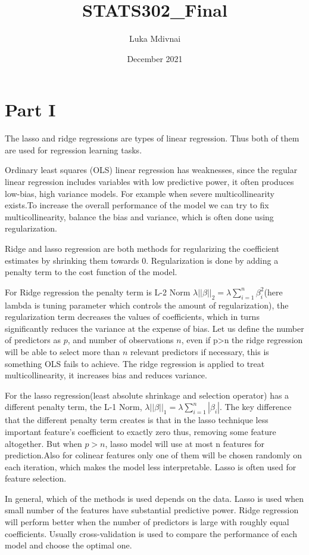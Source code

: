 \documentclass{article}
\title{STATS302\_Final}
\author{Luka Mdivnai}
\date{December 2021}
\begin{document}
\maketitle
\section*{Part I}
The lasso and ridge regressions are types of linear regression. Thus both of them are used for regression learning tasks. 

Ordinary least squares (OLS) linear regression has weaknesses, since the regular linear regression includes variables with low predictive power, it often produces low-bias, high variance models. For example when severe multicollinearity exists.To increase the overall performance of the model we can try to fix multicollinearity, balance the bias and variance, which is often done using regularization.

Ridge and lasso regression are both methods for regularizing the coefficient estimates by shrinking them towards 0. Regularization is done by adding a penalty term to the cost function of the model. 

For Ridge regression the penalty term is L-2 Norm $\lambda ||\beta||_2 = \lambda  \sum_{i=1}^{n}{\beta_i^2}$(here lambda is tuning parameter which controls the amount of regularization), the regularization term decreases the values of coefficients, which in turns significantly reduces the variance at the expense of bias.  Let us define the number of predictors as $p$, and number of observations $n$, even if p>n the ridge regression will be able to select more than $n$  relevant predictors if necessary, this is something OLS fails to achieve. The ridge regression is applied to treat multicollinearity, it increases bias and reduces variance.

For the lasso regression(least absolute shrinkage and selection operator) has a different penalty term, the L-1 Norm, $\lambda ||\beta||_1 = \lambda  \sum_{i=1}^{n}{|\beta_i|}$. The key difference that the different penalty term creates is that in the lasso technique less important feature’s coefficient to exactly zero thus, removing some feature altogether. But when $p>n$, lasso model will use at most n features for prediction.Also for colinear features only one of them will be chosen randomly on each iteration, which makes the model less interpretable. Lasso is often used for feature selection.

In general, which of the methods is used depends on the data. Lasso is used when small number of the features have substantial predictive power. Ridge regression will perform better when the number of predictors is large with roughly equal coefficients. Usually cross-validation is used to compare the performance of each model and choose the optimal one.
\end{document}
